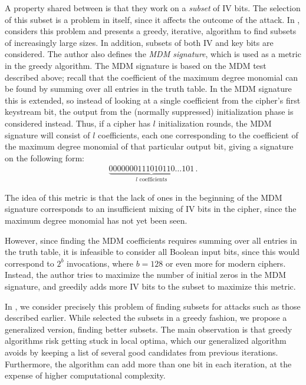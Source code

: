 A property shared between \cite{saarinen:2006,englund:2007,vielhaber:2007,dinur:2009} is that they work on a \emph{subset} of IV bits.
The selection of this subset is a problem in itself, since it affects the outcome of the attack.
In \cite{stankovski:2010}, \citeauthor{stankovski:2010} considers this problem and presents a greedy, iterative, algorithm to find subsets of increasingly large sizes.
In addition, subsets of both IV and key bits are considered.
The author also defines the \emph{MDM signature}, which is used as a metric in the greedy algorithm.
The MDM signature is based on the MDM test described above; recall that the coefficient of the maximum degree monomial can be found by summing over all entries in the truth table.
In the MDM signature this is extended, so instead of looking at a single coefficient from the cipher's first keystream bit, the output from the (normally suppressed) initialization phase is considered instead.
Thus, if a cipher has $l$ initialization rounds, the MDM signature will consist of $l$ coefficients, each one corresponding to the coefficient of the maximum degree monomial of that particular output bit, giving a signature on the following form:
\begin{align}
	\underbrace{0000000111010110\ldots101}_{l\text{ coefficients}} \,.
\end{align}

The idea of this metric is that the lack of ones in the beginning of the MDM signature corresponds to an insufficient mixing of IV bits in the cipher, since the  maximum degree monomial has not yet been seen.

However, since finding the MDM coefficients requires summing over all entries in the truth table, it is infeasible to consider all Boolean input bits, since this would correspond to $2^b$ invocations, where $b=128$ or even more for modern ciphers.
Instead, the author tries to maximize the number of initial zeros in the MDM signature, and greedily adds more IV bits to the subset to maximize this metric.

In , we consider precisely this problem of finding subsets for attacks such as those described earlier.
While \cite{stankovski:2010} selected the subsets in a greedy fashion, we propose a generalized version, finding better subsets.
The main observation is that greedy algorithms risk getting stuck in local optima, which our generalized algorithm avoids by keeping a list of several good candidates from previous iterations.
Furthermore, the algorithm can add more than one bit in each iteration, at the expense of higher computational complexity.

